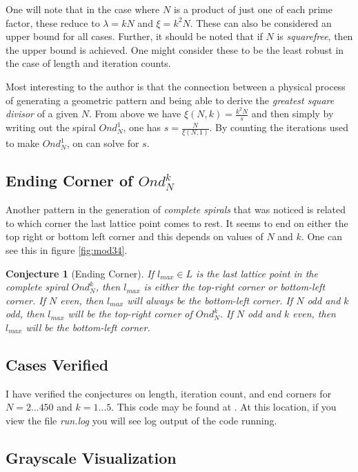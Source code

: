 \documentclass[11pt]{amsart}
\theoremstyle{mydef}
\newtheorem{conj}{Conjecture}[section]
\begin{document}
One will note that in the case where $N$ is a product of just one of each prime factor, these reduce to $\lambda = kN$ and $\xi = k^2N$. These can also be considered an upper bound for all cases. Further, it should be noted that if $N$ is \textit{squarefree}, then the upper bound is achieved. One might consider these to be the least robust in the case of length and iteration counts.

Most interesting to the author is that the connection between a physical process of generating a geometric pattern and being able to derive the \textit{greatest square divisor} of a given $N$. From above we have $\xi(N, k) = \frac{k^2 N}{s}$ and then simply by writing out the spiral $Ond^1_N$, one has $s = \frac{N}{\xi(N,1)}$. By counting the iterations used to make $Ond^1_N$, on can solve for $s$.

\subsection{Ending Corner of $Ond^k_N$}

Another pattern in the generation of \textit{complete spirals} that was noticed is related to which corner the last lattice point comes to rest. It seems to end on either the top right or bottom left corner and this depends on values of $N$ and $k$. One can see this in figure \ref{fig:mod34}.

\begin{conj}[Ending Corner]
If $l_{max} \in L$ is the last lattice point in the complete spiral $Ond^k_N$, then $l_{max}$ is either the top-right corner or bottom-left corner. If $N$ even, then $l_{max}$ will always be the bottom-left corner. If $N$ odd and $k$ odd, then $l_{max}$ will be the top-right corner of $Ond^k_N$. If $N$ odd and $k$ even, then $l_{max}$ will be the bottom-left corner.
\end{conj}

\subsection{Cases Verified}
I have verified the conjectures on length, iteration count, and end corners for $N=2\ldots450$ and $k=1\ldots5$. This code may be found at \cite{PySquare}. At this location, if you view the file \textit{run.log} you will see log output of the code running.

\subsection{Grayscale Visualization}
\end{document}
